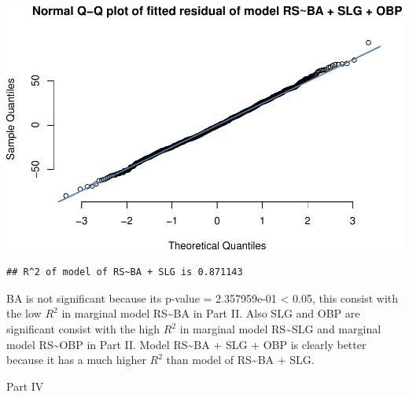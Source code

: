 \documentclass[
]{article}
\newenvironment{Shaded}{\begin{snugshade}}{\end{snugshade}}
\newcommand{\AttributeTok}[1]{\textcolor[rgb]{0.77,0.63,0.00}{#1}}
\newcommand{\FunctionTok}[1]{\textcolor[rgb]{0.00,0.00,0.00}{#1}}
\newcommand{\NormalTok}[1]{#1}
\newcommand{\OtherTok}[1]{\textcolor[rgb]{0.56,0.35,0.01}{#1}}
\newcommand{\SpecialCharTok}[1]{\textcolor[rgb]{0.00,0.00,0.00}{#1}}
\newcommand{\StringTok}[1]{\textcolor[rgb]{0.31,0.60,0.02}{#1}}
\begin{document}
\includegraphics{HW2_Wu-Yulun_files/figure-latex/unnamed-chunk-14-1.pdf}

\begin{Shaded}
\end{Shaded}

\begin{verbatim}
## R^2 of model of RS~BA + SLG is 0.871143
\end{verbatim}

BA is not significant because its p-value = 2.357959e-01 \textless{}
0.05, this consist with the low \(R^2\) in marginal model
RS\textasciitilde BA in Part II. Also SLG and OBP are significant
consist with the high \(R^2\) in marginal model RS\textasciitilde SLG
and marginal model RS\textasciitilde OBP in Part II. Model
RS\textasciitilde BA + SLG + OBP is clearly better because it has a much
higher \(R^2\) than model of RS\textasciitilde BA + SLG.

Part IV
\end{document}
